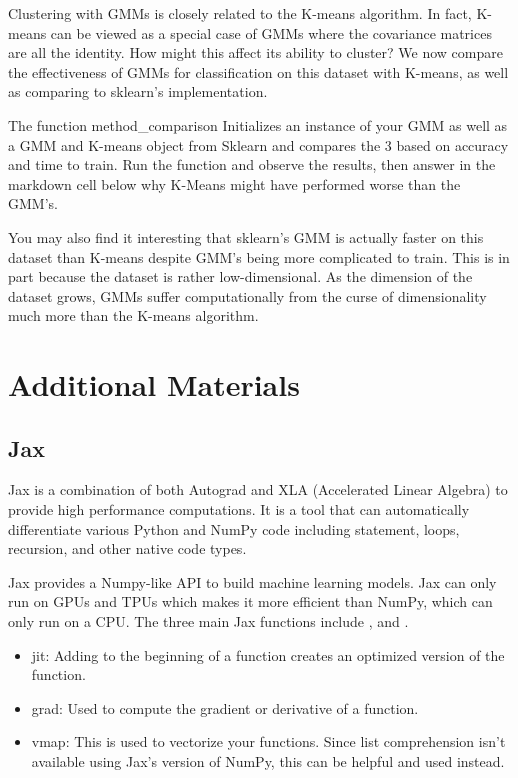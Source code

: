 Clustering with GMMs is closely related to the K-means algorithm.
In fact, K-means can be viewed as a special case of GMMs where the covariance matrices are all the identity. How might this affect its ability to cluster?
We now compare the effectiveness of GMMs for classification on this dataset with K-means, as well as comparing to sklearn's implementation.

\begin{problem}
The function method\_comparison Initializes an instance of your GMM as well as a GMM and K-means object  from Sklearn and compares the 3 based on accuracy and time
to train. Run the function and observe the results, then answer in the markdown cell below why K-Means might have performed worse than the GMM's.
\end{problem}

You may also find it interesting that sklearn's GMM is actually faster on this dataset than K-means despite GMM's being more complicated to train.
This is in part because the dataset is rather low-dimensional.
As the dimension of the dataset grows, GMMs suffer computationally from the curse of dimensionality much more than the K-means algorithm.


\pagebreak

\section*{Additional Materials}

\subsection*{Jax}
Jax is a combination of both Autograd and XLA (Accelerated Linear Algebra) to provide high performance computations. It is a tool that can automatically differentiate various Python and NumPy code including  statement,  loops, recursion, and other native code types.

 Jax provides a Numpy-like API to build machine learning models. Jax can only run on GPUs and TPUs which makes it more efficient than NumPy, which can only run on a CPU. The three main Jax functions include ,  and . 
 
\begin{itemize}
 \item jit: Adding   to the beginning of a function creates an optimized version of the function.
\item grad: Used to compute the gradient or derivative of a function.
\item vmap: This is used to vectorize your functions. Since list comprehension isn't available using Jax's version of NumPy, this can be helpful and used instead. 
\end{itemize}


